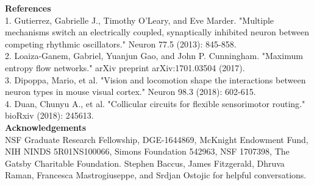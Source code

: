 \documentclass[landscape]{article}
\begin{document}
\begin{minipage}[c]{0.29\linewidth}
{\bf\large References} \\
\normalsize
1. Gutierrez, Gabrielle J., Timothy O’Leary, and Eve Marder. "Multiple mechanisms switch an electrically coupled, synaptically inhibited neuron between competing rhythmic oscillators." Neuron 77.5 (2013): 845-858. \\
2. Loaiza-Ganem, Gabriel, Yuanjun Gao, and John P. Cunningham. "Maximum entropy flow networks." arXiv preprint arXiv:1701.03504 (2017). \\
3. Dipoppa, Mario, et al. "Vision and locomotion shape the interactions between neuron types in mouse visual cortex." Neuron 98.3 (2018): 602-615. \\
4. Duan, Chunyu A., et al. "Collicular circuits for flexible sensorimotor routing." bioRxiv (2018): 245613. \\

{\bf\Large Acknowledgements} \\
NSF Graduate Research Fellowship,  DGE-1644869, McKnight Endowment Fund, NIH NINDS 5R01NS100066, Simons Foundation 542963, NSF 1707398, The Gatsby Charitable Foundation. Stephen Baccus, James Fitzgerald, Dhruva Raman, Francesca Mastrogiuseppe, and Srdjan Ostojic for helpful conversations. \\

\end{minipage}
\end{document}
